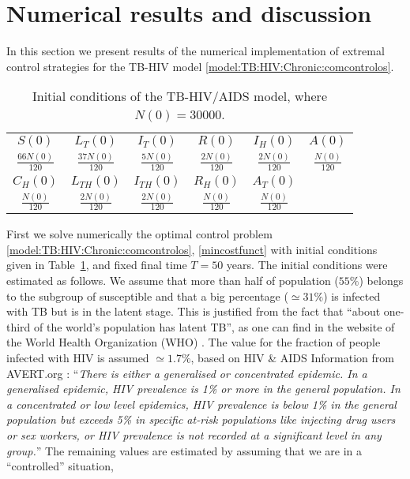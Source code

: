 \documentclass{my_aims}
\theoremstyle{definition}
\begin{document}
\section{Numerical results and discussion}
\label{sec:num:results}

In this section we present results of the numerical implementation
of extremal control strategies for the TB-HIV model
\eqref{model:TB:HIV:Chronic:comcontrolos}.
\begin{table}[!htb]
\centering
\begin{tabular}{c  c  c  c  c  c } \hline\hline
$S(0)$ & $L_T(0)$ & $I_T(0)$ & $R(0)$ & $I_H(0)$ & $A(0)$ \\[0.1cm]
$\frac{66 N(0)}{120}$ & $\frac{37 N(0)}{120}$ & $\frac{5 N(0)}{120}$
& $\frac{2 N(0)}{120}$ & $\frac{2 N(0)}{120}$ & $\frac{N(0)}{120}$ \\[0.2cm] \hline
$C_H(0)$ & $L_{TH}(0)$ & $I_{TH}(0)$ & $R_H(0)$ & $A_T(0)$ & \\[0.1cm]
$\frac{N(0)}{120}$ & $\frac{2 N(0)}{120}$ & $\frac{2 N(0)}{120}$
& $\frac{N(0)}{120}$ & $\frac{N(0)}{120}$ & \\[0.2cm] \hline \hline
\end{tabular}
\caption{Initial conditions of the TB-HIV/AIDS model, where $N(0) = 30000$.}
\label{table:init:cond}
\end{table}
First we solve numerically the optimal control problem \eqref{model:TB:HIV:Chronic:comcontrolos},
\eqref{mincostfunct} with initial conditions given in Table~\ref{table:init:cond}, and fixed final
time $T = 50$ years. The initial conditions were estimated as follows.
We assume that more than half of population ($55\%$) belongs to
the subgroup of susceptible and that a big percentage ($\simeq 31\%$) is infected with TB but is in the latent stage.
This is justified from the fact that ``about one-third of the world's population has latent TB'', as one can find
in the website of the World Health Organization (WHO) \cite{fs:who}.
The value for the fraction of people infected with HIV is assumed $\simeq 1.7\%$,
based on HIV \& AIDS Information from AVERT.org \cite{Worldwide:HIV:AIDS:Stat}:
``\emph{There is either a generalised or concentrated epidemic.
In a generalised epidemic, HIV prevalence is 1\% or more in the general population.
In a concentrated or low level epidemics, HIV prevalence is below 1\% in the general population
but exceeds 5\% in specific at-risk populations like injecting drug users or sex workers,
or HIV prevalence is not recorded at a significant level in any group.}''
The remaining values are estimated by assuming that we are in a ``controlled'' situation,
\end{document}
